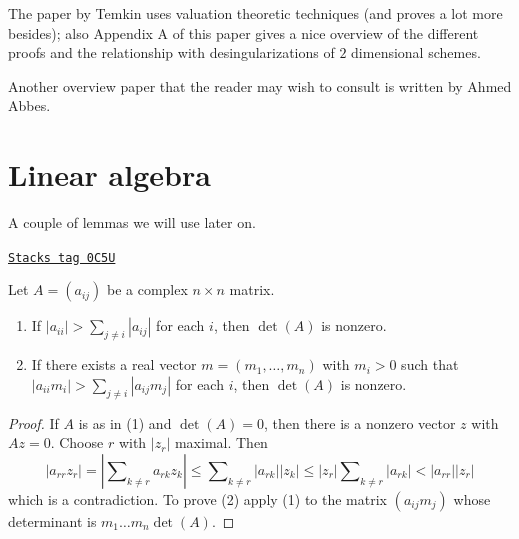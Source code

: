 \medskip\noindent
The paper \cite{Temkin} by Temkin uses valuation theoretic techniques
(and proves a lot more besides); also Appendix A of this paper gives
a nice overview of the different proofs and the relationship with
desingularizations of $2$ dimensional schemes.

\medskip\noindent
Another overview paper that the reader may wish to consult is
\cite{Abbes-ssr} written by Ahmed Abbes.

\section{Linear algebra}
\label{models-section-linear-algebra}
A couple of lemmas we will use later on.

\begin{lemma}[Recurring]
\label{models-lemma-recurring}
\href{https://stacks.math.columbia.edu/tag/0C5U}{\texttt{Stacks tag 0C5U}}

\begin{reference}
\cite[Theorem I]{Taussky}
\end{reference}
Let $A = (a_{ij})$ be a complex $n \times n$ matrix.
\begin{enumerate}
\item If $|a_{ii}| > \sum_{j \not = i} |a_{ij}|$ for each $i$, then
$\det(A)$ is nonzero.
\item If there exists a real vector $m = (m_1, \ldots, m_n)$
with $m_i > 0$ such that $|a_{ii} m_i| > \sum_{j \not = i} |a_{ij}m_j|$
for each $i$, then $\det(A)$ is nonzero.
\end{enumerate}
\end{lemma}

\begin{proof}
If $A$ is as in (1) and $\det(A) = 0$, then there is a nonzero vector
$z$ with $Az = 0$. Choose $r$ with $|z_r|$ maximal. Then
$$
|a_{rr} z_r| = |\sum\nolimits_{k \not = r} a_{rk}z_k| \leq
\sum\nolimits_{k \not = r} |a_{rk}||z_k| \leq
|z_r| \sum\nolimits_{k \not = r} |a_{rk}| < |a_{rr}||z_r|
$$
which is a contradiction. To prove (2) apply (1) to the matrix
$(a_{ij}m_j)$ whose determinant is $m_1 \ldots m_n \det(A)$.
\end{proof}

